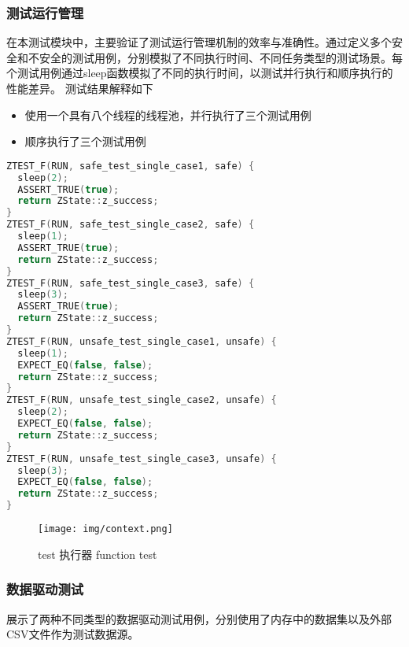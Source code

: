 \documentclass{article}
\begin{document}
\subsubsection{测试运行管理}
在本测试模块中，主要验证了测试运行管理机制的效率与准确性。通过定义多个安全和不安全的测试用例，分别模拟了不同执行时间、不同任务类型的测试场景。每个测试用例通过sleep函数模拟了不同的执行时间，以测试并行执行和顺序执行的性能差异。
测试结果解释如下
\begin{itemize}
    \item 使用一个具有八个线程的线程池，并行执行了三个测试用例
    \item 顺序执行了三个测试用例
\end{itemize}
\begin{framed}
    \begin{lstlisting}[language=C++]
ZTEST_F(RUN, safe_test_single_case1, safe) {
  sleep(2);
  ASSERT_TRUE(true);
  return ZState::z_success;
}
ZTEST_F(RUN, safe_test_single_case2, safe) {
  sleep(1);
  ASSERT_TRUE(true);
  return ZState::z_success;
}
ZTEST_F(RUN, safe_test_single_case3, safe) {
  sleep(3);
  ASSERT_TRUE(true);
  return ZState::z_success;
}
ZTEST_F(RUN, unsafe_test_single_case1, unsafe) {
  sleep(1);
  EXPECT_EQ(false, false);
  return ZState::z_success;
}
ZTEST_F(RUN, unsafe_test_single_case2, unsafe) {
  sleep(2);
  EXPECT_EQ(false, false);
  return ZState::z_success;
}
ZTEST_F(RUN, unsafe_test_single_case3, unsafe) {
  sleep(3);
  EXPECT_EQ(false, false);
  return ZState::z_success;
}
\end{lstlisting}
\end{framed}
\begin{figure}[H]
    \centering
    \texttt{[image: img/context.png]}
    \caption{test 执行器 function test}
    \label{fig:test 执行器 function test}
\end{figure}

\subsubsection{数据驱动测试}
展示了两种不同类型的数据驱动测试用例，分别使用了内存中的数据集以及外部CSV文件作为测试数据源。
\end{document}
